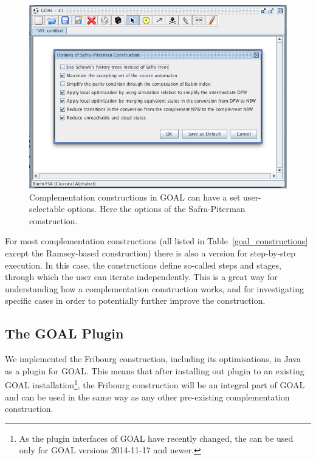 \begin{figure}
\begin{center}
\includegraphics[scale=0.5]{figures/goal_complementation_options.png}
\caption{Complementation constructions in GOAL can have a set user-selectable options. Here the options of the Safra-Piterman construction.}
\label{goal_complementation_options}
\end{center}
\end{figure}

For most complementation constructions (all listed in Table~\ref{goal_constructions} except the Ramsey-based construction) there is also a version for step-by-step execution. In this case, the constructions define so-called steps and stages, through which the user can iterate independently. This is a great way for understanding how a complementation construction works, and for investigating specific cases in order to potentially further improve the construction. 


\subsection{The GOAL Plugin}
\label{implementation}
We implemented the Fribourg construction, including its optimisations, in Java as a plugin for GOAL. This means that after installing out plugin to an existing GOAL installation\footnote{As the plugin interfaces of GOAL have recently changed, the can be used only for GOAL versions 2014-11-17 and newer.}, the Fribourg construction will be an integral part of GOAL and can be used in the same way as any other pre-existing complementation construction.

